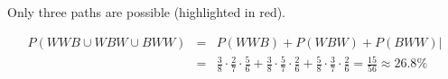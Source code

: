 \documentclass[twoside,11pt,a4paper]{article}
\newif\ifEN \ENtrue	                %
\def\tr|#1|#2|{\ifEN #2\else #1\fi}     %
\def\vsp{\vspace{5mm}}
\theoremstyle{definition}
\newcounter{exc}
\begin{document}
\tr|Nur die drei roten Pfade sind möglich.  
   |Only three paths are possible (highlighted in red). |
\ifEN
\begin{eqnarray*}
P(WWB\cup WBW \cup BWW ) &=& P(WWB)+ P(WBW)+ P(BWW)|\\
&=&\frac{3}{8}\cdot\frac{2}{7}\cdot\frac{5}{6}+\frac{3}{8}\cdot\frac{5}{7}\cdot\frac{2}{6}+\frac{5}{8}\cdot\frac{3}{7}\cdot\frac{2}{6}=\frac{15}{56}\approx 26.8\%
\end{eqnarray*}
\else
\begin{eqnarray*}
P(WWS\cup WSW \cup SWW ) &=& P(WWS)+ P(WSW)+ P(SWW)\\
&=&\frac{3}{8}\cdot\frac{2}{7}\cdot\frac{5}{6}+\frac{3}{8}\cdot\frac{5}{7}\cdot\frac{2}{6}+\frac{5}{8}\cdot\frac{3}{7}\cdot\frac{2}{6}=\frac{15}{56}\approx 26.8\%
\end{eqnarray*}
\fi
\vsp\vsp
\end{document}
